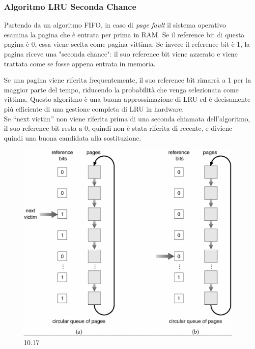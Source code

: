 \subsubsection{Algoritmo LRU Seconda Chance}
Partendo da un algoritmo FIFO, in caso di \textit{page fault} il sistema operativo esamina la pagina che è entrata per prima in RAM. Se il reference bit di questa pagina è 0, essa viene scelta come pagina vittima. Se invece il reference bit è 1, la pagina riceve una "seconda chance": il suo reference bit viene azzerato e viene trattata come se fosse appena entrata in memoria.

Se una pagina viene riferita frequentemente, il suo reference bit rimarrà a 1 per la maggior parte del tempo, riducendo la probabilità che venga selezionata come vittima. Questo algoritmo è una buona approssimazione di LRU ed è decisamente più efficiente di una gestione completa di LRU in hardware.\\
Se “next victim” non viene riferita prima di una seconda chiamata dell’algoritmo, il suo reference bit resta a 0, quindi non è stata riferita di recente, e diviene quindi una buona candidata alla sostituzione.\\

\begin{figure}[h] \centering \includegraphics[width=0.25\linewidth]{images/second_chanceQueue.png} \caption{10.17} \label{fig:10.17} \end{figure}

